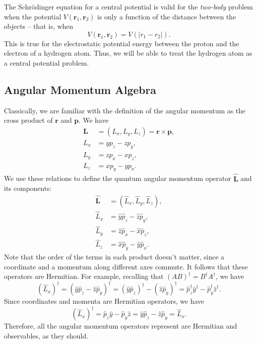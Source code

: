 \begin{framedprop}\label{12.2}
    The Schrödinger equation for a central potential is valid for the \textit{two-body} problem when the potential $V(\mathbf{r}_1,\mathbf{r}_2)$ is only a function of the distance between the objects -- that is, when $$V(\mathbf{r}_1,\mathbf{r}_2)=V(|r_1-r_2|).$$This is true for the electrostatic potential energy between the proton and the electron of a hydrogen atom. Thus, we will be able to treat the hydrogen atom as a central potential problem.
\end{framedprop}

\subsection{Angular Momentum Algebra}\label{angular_momentum_algebra}

Classically, we are familiar with the definition of the angular momentum as the cross product of $\mathbf{r}$ and $\mathbf{p}$. We have \begin{align*}\mathbf{L}&=(L_x,L_y,L_z)=\mathbf{r}\times\mathbf{p},\\ L_x&=yp_z-zp_y,\\ L_y&=zp_x-xp_z, \\ L_z &= xp_y-yp_x. \end{align*}We use these relations to define the quantum angular momentum operator $\hat{\mathbf{L}}$ and its components: \begin{align*}\hat{\mathbf{L}}&=(\hat{L}_x,\hat{L}_y,\hat{L}_z),\\ \hat{L}_x&=\hat{y}\hat{p}_z-\hat{z}\hat{p}_y,\\ \hat{L}_y&=\hat{z}\hat{p}_x-\hat{x}\hat{p}_z, \\ \hat{L}_z &= \hat{x}\hat{p}_y-\hat{y}\hat{p}_x. \end{align*}Note that the order of the terms in each product doesn't matter, since a coordinate and a momentum along different axes commute. It follows that these operators are Hermitian. For example, recalling that $(AB)^\dagger=B^\dagger A^\dagger$, we have $$(\hat{L}_x)^\dagger=(\hat{y}\hat{p}_z-\hat{z}\hat{p}_y)^\dagger=(\hat{y}\hat{p}_z)^\dagger-(\hat{z}\hat{p}_y)^\dagger=\hat{p}_z^\dagger\hat{y}^\dagger-\hat{p}_y^\dagger\hat{z}^\dagger.$$Since coordinates and momenta are Hermitian operators, we have $$(\hat{L}_x)^\dagger=\hat{p}_z\hat{y}-\hat{p}_y\hat{z}=\hat{y}\hat{p}_z-\hat{z}\hat{p}_y=\hat{L}_x.$$Therefore, all the angular momentum operators represent are Hermitian and observables, as they should.

